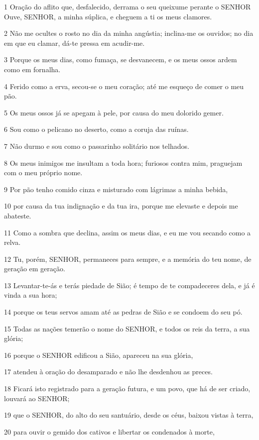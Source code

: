 \par 1 Oração do aflito que, desfalecido, derrama o seu queixume perante o SENHOR Ouve, SENHOR, a minha súplica, e cheguem a ti os meus clamores.
\par 2 Não me ocultes o rosto no dia da minha angústia; inclina-me os ouvidos; no dia em que eu clamar, dá-te pressa em acudir-me.
\par 3 Porque os meus dias, como fumaça, se desvanecem, e os meus ossos ardem como em fornalha.
\par 4 Ferido como a erva, secou-se o meu coração; até me esqueço de comer o meu pão.
\par 5 Os meus ossos já se apegam à pele, por causa do meu dolorido gemer.
\par 6 Sou como o pelicano no deserto, como a coruja das ruínas.
\par 7 Não durmo e sou como o passarinho solitário nos telhados.
\par 8 Os meus inimigos me insultam a toda hora; furiosos contra mim, praguejam com o meu próprio nome.
\par 9 Por pão tenho comido cinza e misturado com lágrimas a minha bebida,
\par 10 por causa da tua indignação e da tua ira, porque me elevaste e depois me abateste.
\par 11 Como a sombra que declina, assim os meus dias, e eu me vou secando como a relva.
\par 12 Tu, porém, SENHOR, permaneces para sempre, e a memória do teu nome, de geração em geração.
\par 13 Levantar-te-ás e terás piedade de Sião; é tempo de te compadeceres dela, e já é vinda a sua hora;
\par 14 porque os teus servos amam até as pedras de Sião e se condoem do seu pó.
\par 15 Todas as nações temerão o nome do SENHOR, e todos os reis da terra, a sua glória;
\par 16 porque o SENHOR edificou a Sião, apareceu na sua glória,
\par 17 atendeu à oração do desamparado e não lhe desdenhou as preces.
\par 18 Ficará isto registrado para a geração futura, e um povo, que há de ser criado, louvará ao SENHOR;
\par 19 que o SENHOR, do alto do seu santuário, desde os céus, baixou vistas à terra,
\par 20 para ouvir o gemido dos cativos e libertar os condenados à morte,
